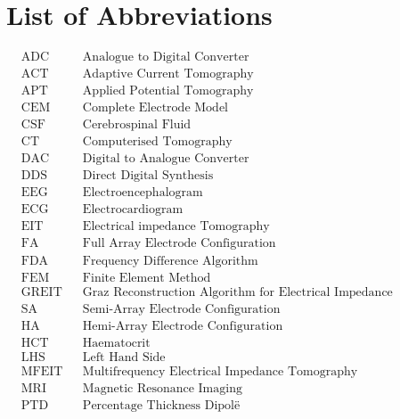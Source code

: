 
\chapter*{List of Abbreviations}
\begin{align*}
	&\text{ADC} &&\text{Analogue to Digital Converter}\\
	&\text{ACT} &&\text{Adaptive Current Tomography}\\
	&\text{APT} &&\text{Applied Potential Tomography}\\
	&\text{CEM} &&\text{Complete Electrode Model}\\
	&\text{CSF} &&\text{Cerebrospinal Fluid}\\
	&\text{CT} &&\text{Computerised Tomography}\\
	&\text{DAC} &&\text{Digital to Analogue Converter}\\
	&\text{DDS} &&\text{Direct Digital Synthesis}\\
	&\text{EEG} &&\text{Electroencephalogram}\\
	&\text{ECG} &&\text{Electrocardiogram}\\
	&\text{EIT} &&\text{Electrical impedance Tomography}\\
	&\text{FA} &&\text{Full Array Electrode Configuration}\\
	&\text{FDA} &&\text{Frequency Difference Algorithm}\\
	&\text{FEM} &&\text{Finite Element Method}\\
	&\text{GREIT} &&\text{Graz Reconstruction Algorithm for Electrical Impedance Tomography}\\
	&\text{SA} &&\text{Semi-Array Electrode Configuration}\\
	&\text{HA} &&\text{Hemi-Array Electrode Configuration}\\
	&\text{HCT} &&\text{Haematocrit}\\
	&\text{LHS} &&\text{Left Hand Side}\\
	&\text{MFEIT} &&\text{Multifrequency Electrical Impedance Tomography}\\
	&\text{MRI} &&\text{Magnetic Resonance Imaging}\\
	&\text{PTD} &&\text{Percentage Thickness Dipol\"e}\\
\end{align*}

